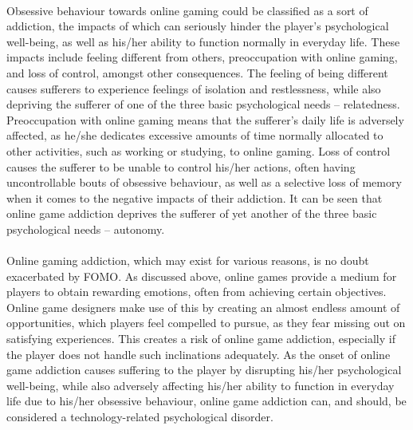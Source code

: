     \paragraph{}
      Obsessive behaviour towards online gaming could be classified as a sort of addiction, the impacts of which can seriously hinder the player’s psychological well-being, as well as his/her ability to function normally in everyday life. These impacts include feeling different from others, preoccupation with online gaming, and loss of control, amongst other consequences. The feeling of being different causes sufferers to experience feelings of isolation and restlessness, while also depriving the sufferer of one of the three basic psychological needs – relatedness. Preoccupation with online gaming means that the sufferer’s daily life is adversely affected, as he/she dedicates excessive amounts of time normally allocated to other activities, such as working or studying, to online gaming. Loss of control causes the sufferer to be unable to control his/her actions, often having uncontrollable bouts of obsessive behaviour, as well as a selective loss of memory when it comes to the negative impacts of their addiction. It can be seen that online game addiction deprives the sufferer of yet another of the three basic psychological needs – autonomy. \cite{sussman2011considering}
    \paragraph{}
      Online gaming addiction, which may exist for various reasons, is no doubt exacerbated by FOMO. As discussed above, online games provide a medium for players to obtain rewarding emotions, often from achieving certain objectives. Online game designers make use of this by creating an almost endless amount of opportunities, which players feel compelled to pursue, as they fear missing out on satisfying experiences. This creates a risk of online game addiction, especially if the player does not handle such inclinations adequately. As the onset of online game addiction causes suffering to the player by disrupting his/her psychological well-being, while also adversely affecting his/her ability to function in everyday life due to his/her obsessive behaviour, online game addiction can, and should, be considered a technology-related psychological disorder.